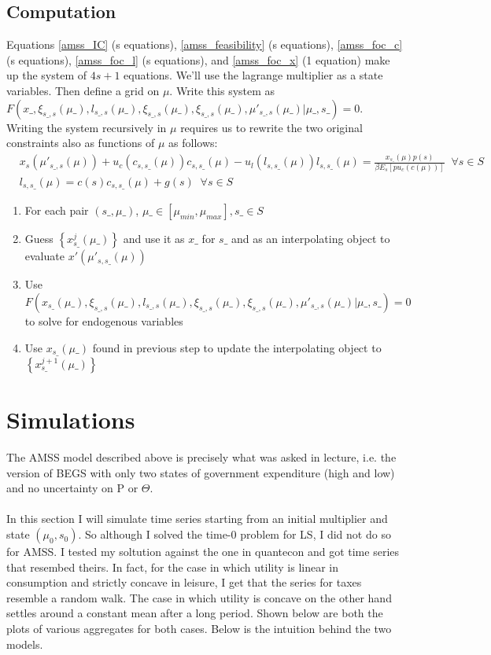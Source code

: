 \documentclass{article} %
\begin{document}
\subsection{Computation}
Equations \ref{amss_IC} (s equations), \ref{amss_feasibility} (s equations), \ref{amss_foc_c}(s equations), \ref{amss_foc_l} (s equations), and \ref{amss_foc_x} (1 equation) make up the system of $4s+1$ equations. We'll use the lagrange multiplier as a state variables. Then define a grid on $\mu$. Write this system as $F(x\_,\xi_{s\_,s}(\mu\_),l_{s\_,s}(\mu\_),\xi_{s\_,s}(\mu\_),\xi_{s\_,s}(\mu\_),\mu'_{s\_,s}(\mu\_)|\mu\_,s\_)=0$. Writing the system recursively in $\mu$ requires us to rewrite the two original constraints also as functions of $\mu$ as follows:
\begin{align}
& x_s(\mu'_{s\_,s}(\mu)) + u_c(c_{s,s\_}(\mu))c_{s,s\_}(\mu) - u_l(l_{s,s\_}(\mu))l_{s,s\_}(\mu) = \frac{x_{s\_}(\mu) p(s)}{\beta E_s[pu_c(c(\mu))]} \;\; \forall s \in S    \label{amss_IC} \\
  & l_{s,s\_}(\mu) = c(s)c_{s,s\_}(\mu) + g(s) \;\; \forall s \in S \label{amss_feasibility}
\end{align}

\begin{enumerate}
\item For each pair $(s\_,\mu\_)$, $\mu\_ \in [\mu_{min},\mu_{max}], s\_ \in S$
\item Guess $\left\{x_{s\_}^j(\mu\_) \right\}$ and use it as $x\_$ for $s\_$ and as an interpolating object to evaluate $x'(\mu'_{s,s\_}(\mu))$
\item Use $F(x_{s\_}(\mu\_),\xi_{s\_,s}(\mu\_),l_{s\_,s}(\mu\_),\xi_{s\_,s}(\mu\_),\xi_{s\_,s}(\mu\_),\mu'_{s\_,s}(\mu\_)|\mu\_,s\_)=0$ to solve for endogenous variables
\item Use $x_{s\_}(\mu\_)$ found in previous step to update the interpolating object to $\left\{x_{s\_}^{j+1}(\mu\_) \right\}$
\end{enumerate}
\section{Simulations}
The AMSS model described above is precisely what was asked in lecture, i.e. the version of BEGS with only two states of government expenditure (high and low) and no uncertainty on P or $\Theta$. \\
\\
In this section I will simulate time series starting from an initial multiplier and state $(\mu_0, s_0)$. So although I solved the time-0 problem for LS, I did not do so for AMSS. I tested my soltution against the one in quantecon and got time series that resembed theirs. In fact, for the case in which utility is linear in consumption and strictly concave in leisure, I get that the series for taxes resemble a random walk. The case in which utility is concave on the other hand settles around a constant mean after a long period. Shown below are both the plots of various aggregates for both cases. Below is the intuition behind the two models. 
\end{document}
